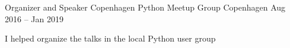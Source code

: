 

\begin{cventries}

  \cventry
    {Organizer and Speaker} %
    {Copenhagen Python Meetup Group} %
    {Copenhagen} %
    {Aug 2016 – Jan 2019} %
    {
      \begin{cvitems} %
	\item {I helped organize the talks in the local Python user group}
      \end{cvitems}
    }


\end{cventries}
